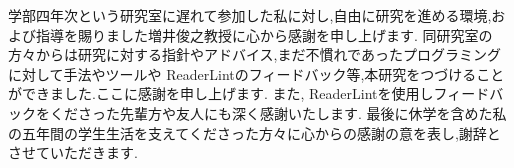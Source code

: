 \begin{acknowledgment}
    学部四年次という研究室に遅れて参加した私に対し,自由に研究を進める環境,および指導を賜りました増井俊之教授に心から感謝を申し上げます.
    同研究室の方々からは研究に対する指針やアドバイス,まだ不慣れであったプログラミングに対して手法やツールや
    ReaderLintのフィードバック等,本研究をつづけることができました.ここに感謝を申し上げます.
    また, ReaderLintを使用しフィードバックをくださった先輩方や友人にも深く感謝いたします.
    最後に休学を含めた私の五年間の学生生活を支えてくださった方々に心からの感謝の意を表し,謝辞とさせていただきます.
\end{acknowledgment}


